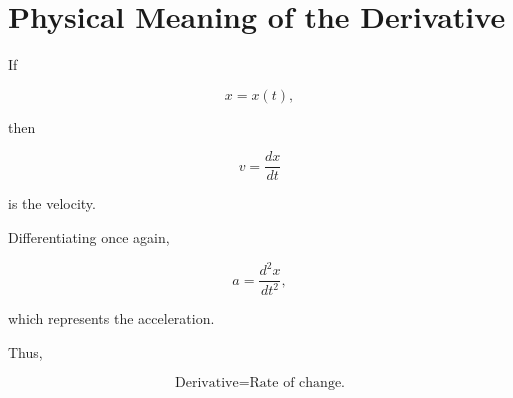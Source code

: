 \section{Physical Meaning of the Derivative}

If

\[
x=x(t),
\]

then

\[
\boxed{
	v=\frac{dx}{dt}
}
\]

is the velocity.

Differentiating once again,

\[
\boxed{
	a=\frac{d^2x}{dt^2},
}
\]

which represents the acceleration.

Thus,

\[
\boxed{
	\text{Derivative}
	=
	\text{Rate of change.}
}
\]

